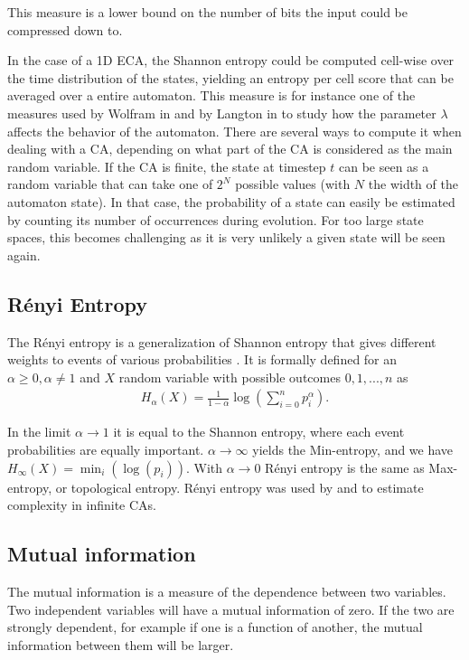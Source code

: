 This measure is a lower bound on the number of bits the input could be
compressed down to.

In the case of a 1D \ac{ECA}, the Shannon entropy could be computed cell-wise
over the time distribution of the states, yielding an entropy per cell score
that can be averaged over a entire automaton. This measure is for instance one
of the measures used by Wolfram in
\parencite{wolframStatisticalMechanicsCellular1983} and by Langton in
\parencite{langtonComputationEdgeChaos1990} to study how the parameter $\lambda$
affects the behavior of the automaton. There are several ways to compute it when
dealing with a CA, depending on what part of the CA is considered as the main
random variable. If the CA is finite, the state at timestep $t$ can be seen as a
random variable that can take one of $2^N$ possible values (with $N$ the width
of the automaton state). In that case, the probability of a state can easily be
estimated by counting its number of occurrences during evolution. For too large
state spaces, this becomes challenging as it is very unlikely a given state will
be seen again.

\subsection{Rényi Entropy}
The Rényi entropy is a generalization of Shannon entropy that gives different
weights to events of various probabilities
\parencite{renyiMeasuresEntropyInformation1961}. It is formally defined for an
$\alpha \geq 0, \alpha \neq 1$ and $X$ random variable with possible outcomes $0, 1, ..., n$ as
\begin{align*}
  H_\alpha(X) = \frac{1}{1-\alpha} \log\left(\sum_{i=0}^np_i^\alpha\right).
\end{align*}

In the limit $\alpha \rightarrow 1$ it is equal to the Shannon entropy, where each event
probabilities are equally important. $\alpha \rightarrow \infty$ yields the Min-entropy, and we have
$H_{\infty} (X) = \min_{i}(\log(p_{i}))$. With $\alpha \rightarrow 0$ Rényi entropy is the same as
Max-entropy, or topological entropy. Rényi entropy was used by
\textcite{wolframStatisticalMechanicsCellular1983} and
\textcite{lindgrenComplexityMeasuresCellular1988} to estimate complexity in
infinite \acp{CA}.

\subsection{Mutual information}
The mutual information is a measure of the dependence between two variables. Two
independent variables will have a mutual information of zero. If the two are
strongly dependent, for example if one is a function of another, the mutual
information between them will be larger.

